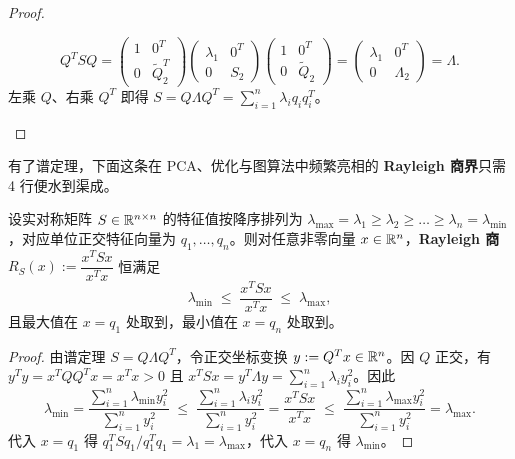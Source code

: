 \begin{proof}
\begin{enumerate}
  \[
    Q^T S Q
    = \begin{pmatrix} 1 & 0^T \\ 0 & \widetilde{Q}_2^T \end{pmatrix}
      \begin{pmatrix} \lambda_1 & 0^T \\ 0 & S_2 \end{pmatrix}
      \begin{pmatrix} 1 & 0^T \\ 0 & \widetilde{Q}_2 \end{pmatrix}
    = \begin{pmatrix} \lambda_1 & 0^T \\ 0 & \Lambda_2 \end{pmatrix} = \Lambda.
  \]
  左乘 $Q$、右乘 $Q^T$ 即得 $S = Q\Lambda Q^T = \sum_{i=1}^n \lambda_i q_i q_i^T$。
\end{enumerate}
\end{proof}

有了谱定理，下面这条在 PCA、优化与图算法中频繁亮相的 \textbf{Rayleigh 商界}只需 4 行便水到渠成。

\begin{thmBox}
\begin{corollary}
\label{cor:ch3-rayleigh}
设实对称矩阵 $S \in \mathbb{R}^{n\times n}$ 的特征值按降序排列为 $\lambda_{\max} = \lambda_1 \ge \lambda_2 \ge \dots \ge \lambda_n = \lambda_{\min}$，对应单位正交特征向量为 $q_1, \dots, q_n$。则对任意非零向量 $x \in \mathbb{R}^n$，\textbf{Rayleigh 商} $R_S(x) := \dfrac{x^T S x}{x^T x}$ 恒满足
\begin{equation}
  \lambda_{\min} \;\le\; \frac{x^T S x}{x^T x} \;\le\; \lambda_{\max}, \label{eq:ch3-rayleigh}
\end{equation}
且最大值在 $x = q_1$ 处取到，最小值在 $x = q_n$ 处取到。
\end{corollary}
\end{thmBox}

\begin{proof}
由谱定理 $S = Q\Lambda Q^T$，令正交坐标变换 $y := Q^T x \in \mathbb{R}^n$。因 $Q$ 正交，有 $y^T y = x^T Q Q^T x = x^T x > 0$ 且 $x^T S x = y^T \Lambda y = \sum_{i=1}^n \lambda_i y_i^2$。因此
\[
  \lambda_{\min} = \frac{\sum_{i=1}^n \lambda_{\min} y_i^2}{\sum_{i=1}^n y_i^2}
  \;\le\; \frac{\sum_{i=1}^n \lambda_i y_i^2}{\sum_{i=1}^n y_i^2}
  = \frac{x^T S x}{x^T x}
  \;\le\; \frac{\sum_{i=1}^n \lambda_{\max} y_i^2}{\sum_{i=1}^n y_i^2} = \lambda_{\max}.
\]
代入 $x = q_1$ 得 $q_1^T S q_1 / q_1^T q_1 = \lambda_1 = \lambda_{\max}$，代入 $x = q_n$ 得 $\lambda_{\min}$。
\end{proof}

